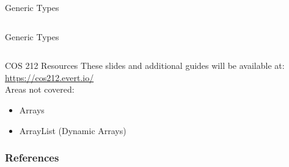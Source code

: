 \documentclass{beamer}
\begin{document}
\begin{frame}{Generic Types}
    \inputminted{java}{BoxGeneric.java}
\end{frame}

\begin{frame}{Generic Types}
    \inputminted{java}{BoxGenericUsage.java}
\end{frame}

\begin{frame}{COS 212 Resources}
    These slides and additional guides will be available at:
    \url{https://cos212.evert.io/} \\
    
    Areas not covered:
    \begin{itemize}
        \item Arrays
        \item ArrayList (Dynamic Arrays)
    \end{itemize}
\end{frame}

\begin{frame}[t,allowframebreaks]
  \frametitle{References}
  \printbibliography
 \end{frame}
\end{document}
